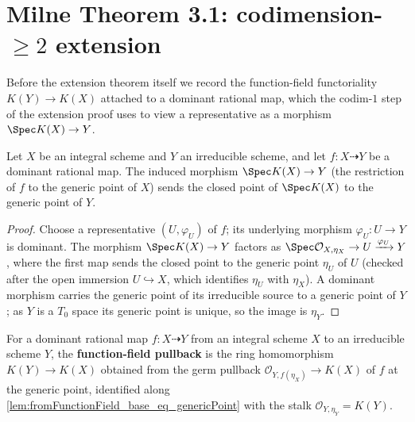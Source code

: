 \section{Milne Theorem 3.1: codimension-\(\geq 2\) extension}
\label{sec:milne_thm31}

Before the extension theorem itself we record the function-field functoriality
\(K(Y) \to K(X)\) attached to a dominant rational map, which the codim-\(1\) step of
the extension proof uses to view a representative as a morphism \(\Spec K(X) \to Y\).

\begin{lemma}
  \label{lem:fromFunctionField_base_eq_genericPoint}
  Let \(X\) be an integral scheme and \(Y\) an irreducible scheme, and let
  \(f \colon X \dashrightarrow Y\) be a dominant rational map. The induced morphism
  \(\Spec K(X) \to Y\) (the restriction of \(f\) to the generic point of \(X\))
  sends the closed point of \(\Spec K(X)\) to the generic point of \(Y\).
\end{lemma}

\begin{proof}\leanok
  Choose a representative \((U, \varphi_U)\) of \(f\); its underlying morphism
  \(\varphi_U \colon U \to Y\) is dominant. The morphism \(\Spec K(X) \to Y\) factors as
  \(\Spec \mathcal O_{X,\eta_X} \to U \xrightarrow{\varphi_U} Y\), where the first map
  sends the closed point to the generic point \(\eta_U\) of \(U\) (checked after the open
  immersion \(U \hookrightarrow X\), which identifies \(\eta_U\) with \(\eta_X\)). A
  dominant morphism carries the generic point of its irreducible source to a generic
  point of \(Y\); as \(Y\) is a \(T_0\) space its generic point is unique, so the image
  is \(\eta_Y\).
\end{proof}

\begin{definition}\leanok
  \label{def:functionFieldPullback}
  For a dominant rational map \(f \colon X \dashrightarrow Y\) from an integral scheme
  \(X\) to an irreducible scheme \(Y\), the \textbf{function-field pullback} is the ring
  homomorphism \(K(Y) \to K(X)\) obtained from the germ pullback
  \(\mathcal O_{Y, f(\eta_X)} \to K(X)\) of \(f\) at the generic point, identified along
  \cref{lem:fromFunctionField_base_eq_genericPoint} with the stalk
  \(\mathcal O_{Y,\eta_Y} = K(Y)\).
\end{definition}

